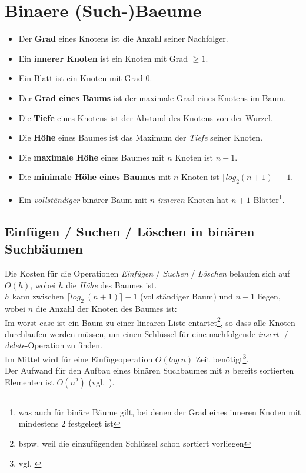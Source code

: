 \section{Binaere (Such-)Baeume}


\begin{itemize}
    \item Der \textbf{Grad} eines Knotens ist die Anzahl seiner Nachfolger.
    \item Ein \textbf{innerer Knoten} ist ein Knoten mit Grad $\geq 1$.
    \item Ein Blatt ist ein Knoten mit Grad $0$.
    \item Der \textbf{Grad eines Baums} ist der maximale Grad eines Knotens im Baum.
    \item Die \textbf{Tiefe} eines Knotens ist der Abstand des Knotens von der Wurzel.
    \item Die \textbf{Höhe} eines Baumes ist das Maximum der \textit{Tiefe} seiner Knoten.
    \item Die \textbf{maximale Höhe} eines Baumes mit $n$ Knoten ist $n - 1$.
    \item Die \textbf{minimale Höhe eines Baumes}  mit $n$ Knoten ist $\lceil log_2(n + 1) \rceil - 1$.
    \item Ein \textit{vollständiger} binärer Baum mit $n$ \textit{inneren} Knoten hat $n + 1$ Blätter\footnote{
    was auch für binäre Bäume gilt, bei denen der Grad eines inneren Knoten mit mindestens $2$ festgelegt ist
    }.
 \end{itemize}


\subsection{Einfügen / Suchen / Löschen in binären Suchbäumen}

Die Kosten für die Operationen \textit{Einfügen} / \textit{Suchen} / \textit{Löschen} belaufen sich auf $O(h)$, wobei $h$ die \textit{Höhe} des Baumes ist.\\

\noindent
$h$ kann zwischen $\lceil log_2\ (n + 1) \rceil - 1$ (vollständiger Baum) und $n - 1$ liegen, wobei $n$ die Anzahl der Knoten des Baumes ist:\\
\noindent
Im worst-case ist ein Baum zu einer linearen Liste entartet\footnote{
    bspw. weil die einzufügenden Schlüssel schon sortiert vorliegen
}, so dass alle Knoten durchlaufen werden müssen, um einen Schlüssel für eine nachfolgende \textit{insert}- / \textit{delete}-Operation zu finden.\\

\noindent
Im Mittel wird für eine Einfügeoperation $O(log\ n)$ Zeit benötigt\footnote{
    vgl. \cite[136 ff.]{GD18d}
}.\\


\noindent
Der Aufwand für den Aufbau eines binären Suchbaumes mit $n$ bereits sortierten Elementen ist $O(n^2)$ (vgl.~\cite[235 f.]{GD18d}).

